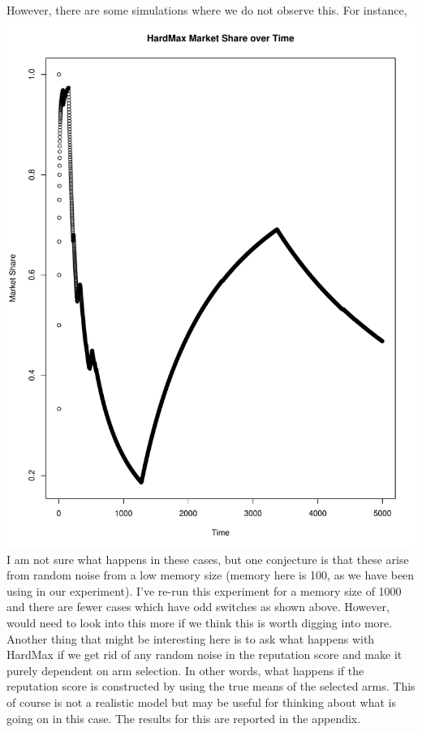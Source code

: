 \documentclass[11pt,letterpaper]{article}
\begin{document}
However, there are some simulations where we do not observe this. For instance, \\
\includegraphics[scale=0.30]{odd_ms_over_time} \\

I am not sure what happens in these cases, but one conjecture is that these arise from random noise from a low memory size (memory here is 100, as we have been using in our experiment). I've re-run this experiment for a memory size of 1000 and there are fewer cases which have odd switches as shown above. However, would need to look into this more if we think this is worth digging into more. Another thing that might be interesting here is to ask what happens with HardMax if we get rid of any random noise in the reputation score and make it purely dependent on arm selection. In other words, what happens if the reputation score is constructed by using the true means of the selected arms. This of course is not a realistic model but may be useful for thinking about what is going on in this case. The results for this are reported in the appendix.\\
\end{document}
